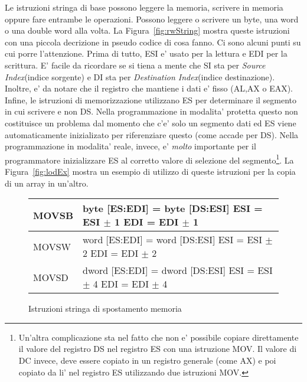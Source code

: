 Le istruzioni stringa di base possono leggere la memoria, scrivere
in memoria oppure fare entrambe le operazioni. Possono leggere o
scrivere un byte, una word o una double word alla volta.
La Figura~\ref{fig:rwString} mostra queste istruzioni con una 
piccola decrizione in pseudo codice di cosa fanno. Ci sono alcuni
punti su cui porre l'attenzione. Prima di tutto, ESI e' usato per 
la lettura e EDI per la scrittura. E' facile da ricordare se si
tiena a mente che SI sta per \emph{Source Index}(indice sorgente) e DI
sta per \emph{Destination Index}(indice destinazione).  
Inoltre, e' da notare che il registro che mantiene i dati e' fisso
(AL,AX o EAX). Infine, le istruzioni di memorizzazione utilizzano
ES per determinare il segmento in cui scrivere e non DS. Nella 
programmazione in modalita' protetta questo non costituisce un 
problema dal momento che c'e' solo un segmento dati ed ES viene
automaticamente inizializato per riferenziare questo (come accade
per DS). Nella programmazione in modalita' reale, invece, e'
\emph{molto} importante per il programmatore inizializzare ES
al corretto valore di selezione del segmento\footnote{
Un'altra complicazione sta nel fatto che non e' possibile copiare
direttamente il valore del registro DS nel registro ES con una 
istruzione {\code MOV}. Il valore di DC invece, deve essere copiato
in un registro generale (come AX) e poi copiato da li' nel registro
ES utilizzando due istruzioni {\code MOV}.}. La Figura~\ref{fig:lodEx}   
mostra un esempio di utilizzo di queste istruzioni per la copia di
un array in un'altro.

\begin{figure}[t]
\centering
{\code
\begin{tabular}{|lp{2.5in}|}
\hline
MOVSB & byte [ES:EDI] = byte [DS:ESI] \newline ESI = ESI $\pm$ 1 \newline
        EDI = EDI $\pm$ 1 \\
\hline
MOVSW & word [ES:EDI] = word [DS:ESI] \newline ESI = ESI $\pm$ 2 \newline
        EDI = EDI $\pm$ 2 \\
\hline
MOVSD & dword [ES:EDI] = dword [DS:ESI] \newline ESI = ESI $\pm$ 4 \newline
        EDI = EDI $\pm$ 4 \\
\hline
\end{tabular}
}
\caption{Istruzioni stringa di spostamento memoria\label{fig:movString} 
          }
\end{figure}

